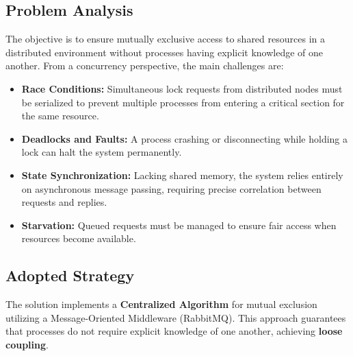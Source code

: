 \documentclass{scrartcl}
\begin{document}
\subsection{Problem Analysis}
The objective is to ensure mutually exclusive access to shared resources in a distributed environment without processes having explicit knowledge of one another. From a concurrency perspective, the main challenges are:
\begin{itemize}
    \item \textbf{Race Conditions:} Simultaneous lock requests from distributed nodes must be serialized to prevent multiple processes from entering a critical section for the same resource.
    \item \textbf{Deadlocks and Faults:} A process crashing or disconnecting while holding a lock can halt the system permanently.
    \item \textbf{State Synchronization:} Lacking shared memory, the system relies entirely on asynchronous message passing, requiring precise correlation between requests and replies.
    \item \textbf{Starvation:} Queued requests must be managed to ensure fair access when resources become available.
\end{itemize}

\subsection{Adopted Strategy}
The solution implements a \textbf{Centralized Algorithm} for mutual exclusion  utilizing a Message-Oriented Middleware (RabbitMQ). This approach guarantees that processes do not require explicit knowledge of one another, achieving \textbf{loose coupling}.
\end{document}
